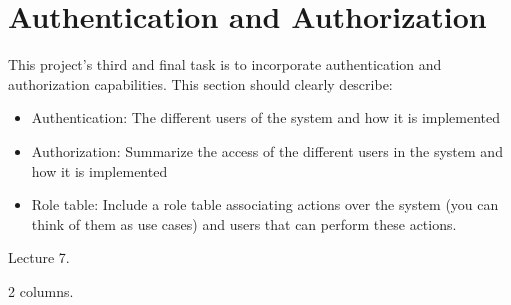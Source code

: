 \section{Authentication and Authorization}

This project's third and final task is to incorporate authentication and authorization capabilities.
This section should clearly describe:

\begin{itemize}
    \item Authentication: The different users of the system and how it is implemented
    \item Authorization: Summarize the access of the different users in the system and how it is implemented
    \item Role table: Include a role table associating actions over the system (you can think of them as use cases) and users that can perform these actions.
\end{itemize}

 Lecture 7.

 2 columns.
